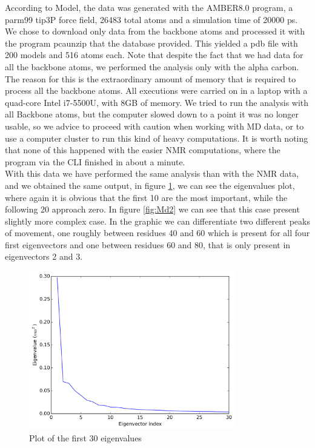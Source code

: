 \documentclass[12pt]{article}
\begin{document}
According to Model, the data was generated with the AMBER8.0 program, a 	parm99 tip3P force field, 26483 total atoms and a simulation time of 20000 ps. We chose to download only data from the backbone atoms and processed it with the program pcaunzip that the database provided. This yielded a pdb file with 200 models and 516 atoms each. Note that despite the fact that we had data for all the backbone atoms, we performed the analysis only with the alpha carbon. The reason for this is the extraordinary amount of memory that is required to process all the backbone atoms. All executions were carried on in a laptop with a quad-core Intel i7-5500U, with 8GB of memory. We tried to run the analysis with all Backbone atoms, but the computer slowed down to a point it was no longer usable, so we advice to proceed with caution when working with MD data, or to use a computer cluster to run this kind of heavy computations. It is worth noting that none of this happened with the easier NMR computations, where the program via the CLI finished in about a minute.\\

With this data we have performed the same analysis than with the NMR data, and we obtained the same output, in figure \ref{fig:Md1}, we can see the eigenvalues plot, where again it is obvious that the first 10 are the most important, while the following 20 approach zero. In figure \ref{fig:Md2} we can see that this case present slightly more complex case. In the graphic we can differentiate two different peaks of movement, one roughly between residues 40 and 60 which is present for all four first eigenvectors and one between residues 60 and 80, that is only present in eigenvectors 2 and 3.

\begin{figure}[h]
\centering
\includegraphics[width=0.8\textwidth]{eig_1dpx_plot.png}
\caption{Plot of the first 30 eigenvalues}
\label{fig:Md1}
\end{figure}
\end{document}
